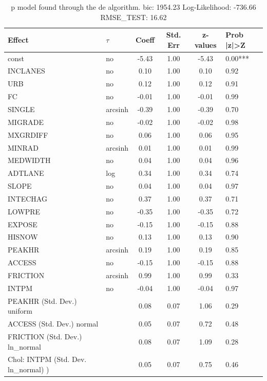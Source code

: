 \begin{table}
	\caption{p model found through the de algorithm. bic: 1954.23 Log-Likelihood: -736.66 RMSE_TEST: 16.62}
	\begin{center}
		\begin{tabular}{|l|l|c|c|c|l|}
			\hline
			Effect & $\tau$ & Coeff & Std. Err & z-values & Prob |z|>Z \\
			\hline
			const & no & -5.43 & 1.00 & -5.43 & 0.00*** \\
			\hline
			INCLANES & no & 0.10 & 1.00 & 0.10 & 0.92 \\
			\hline
			URB & no & 0.12 & 1.00 & 0.12 & 0.91 \\
			\hline
			FC & no & -0.01 & 1.00 & -0.01 & 0.99 \\
			\hline
			SINGLE & arcsinh & -0.39 & 1.00 & -0.39 & 0.70 \\
			\hline
			MIGRADE & no & -0.02 & 1.00 & -0.02 & 0.98 \\
			\hline
			MXGRDIFF & no & 0.06 & 1.00 & 0.06 & 0.95 \\
			\hline
			MINRAD & arcsinh & 0.01 & 1.00 & 0.01 & 0.99 \\
			\hline
			MEDWIDTH & no & 0.04 & 1.00 & 0.04 & 0.96 \\
			\hline
			ADTLANE & log & 0.34 & 1.00 & 0.34 & 0.74 \\
			\hline
			SLOPE & no & 0.04 & 1.00 & 0.04 & 0.97 \\
			\hline
			INTECHAG & no & 0.37 & 1.00 & 0.37 & 0.71 \\
			\hline
			LOWPRE & no & -0.35 & 1.00 & -0.35 & 0.72 \\
			\hline
			EXPOSE & no & -0.15 & 1.00 & -0.15 & 0.88 \\
			\hline
			HISNOW & no & 0.13 & 1.00 & 0.13 & 0.90 \\
			\hline
			PEAKHR & arcsinh & 0.19 & 1.00 & 0.19 & 0.85 \\
			\hline
			ACCESS & no & -0.15 & 1.00 & -0.15 & 0.88 \\
			\hline
			FRICTION & arcsinh & 0.99 & 1.00 & 0.99 & 0.33 \\
			\hline
			INTPM & no & -0.04 & 1.00 & -0.04 & 0.97 \\
			\hline
			PEAKHR (Std. Dev.) uniform &  & 0.08 & 0.07 & 1.06 & 0.29 \\
			\hline
			ACCESS (Std. Dev.) normal &  & 0.05 & 0.07 & 0.72 & 0.48 \\
			\hline
			FRICTION (Std. Dev.) ln_normal &  & 0.08 & 0.07 & 1.09 & 0.28 \\
			\hline
			 Chol: INTPM (Std. Dev. ln_normal) ) &  & 0.05 & 0.07 & 0.75 & 0.46 \\
			\hline
		\end{tabular}
	\end{center}
\end{table}